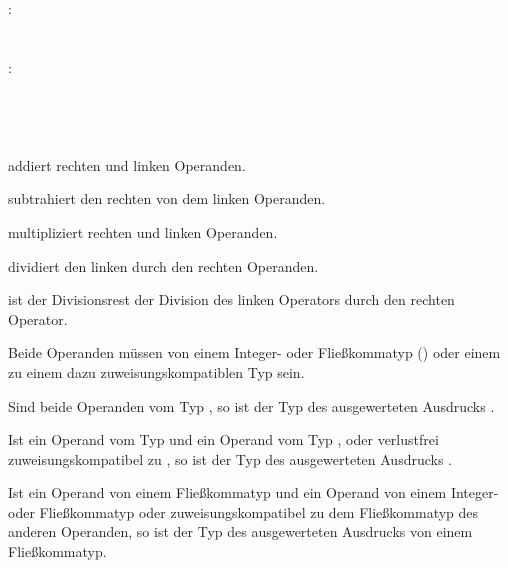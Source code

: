 :\label{asdr_add}\\
\hspace*{1cm} \\
\hspace*{1cm}  \\
:\label{asdr_add_operanden}\\
\hspace*{1cm}\glq\Gt{+}\grq  {} \\
\hspace*{1cm}\glq\Gt{+}\grq  {}  \\
\hspace*{1cm}\glq\Gt{-}\grq  {} \\
\hspace*{1cm}\glq\Gt{-}\grq  {}  \\

\op{\plus} addiert rechten und linken Operanden.

\op{-} subtrahiert den rechten von dem linken Operanden.

\op{*} multipliziert rechten und linken Operanden.

\op{/} dividiert den linken durch den rechten Operanden.

\op{\%} ist der Divisionsrest der Division des linken Operators durch den rechten Operator.

Beide Operanden müssen von einem Integer- oder Fließkommatyp () oder einem
zu einem dazu zuweisungskompatiblen Typ sein.

Sind beide Operanden vom Typ , so ist der Typ des ausgewerteten Ausdrucks .

Ist ein Operand vom Typ  und ein Operand vom Typ ,  oder
verlustfrei zuweisungskompatibel zu , so ist der Typ des ausgewerteten Ausdrucks .

Ist ein Operand von einem Fließkommatyp und ein Operand von einem Integer- oder Fließkommatyp
oder zuweisungskompatibel zu dem Fließkommatyp des anderen Operanden,
so ist der Typ des ausgewerteten Ausdrucks von einem Fließkommatyp.


